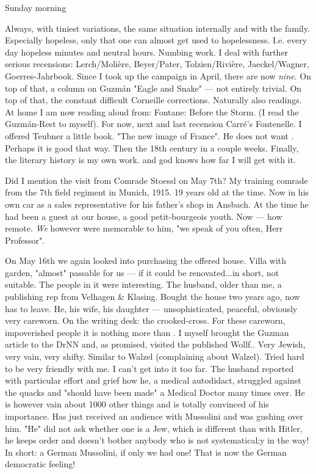 Sunday morning

Always, with tiniest variations, the same situation internally and with the family. Especially hopeless, only that one can almost get used to hopelessness. I.e. every day hopeless minutes and neutral hours.  
Numbing work. I deal with further serious recensions: Lerch/Molière, Beyer/Pater, Tolzien/Rivière, Jaeckel/Wagner, Goerres-Jahrbook. Since I took up the campaign in April, there are now \textit{nine}. On top of that, a column on Guzmán "Eagle and Snake" — not entirely trivial. On top of that, the constant difficult Corneille corrections. Naturally also readings. 
At home I am now reading aloud from: Fontane: Before the Storm. (I read the Guzmán-Rest to myself). For now, next and last recension Carré's Fontenelle.
I offered Teubner a little book. "The new image of France". He does not want . Perhaps it is good that way. Then  the 18th century in a couple weeks. Finally, the literary history is my own work. and god knows how far I will get with it.

Did I mention the visit from Comrade Stoessl on May 7th? My training comrade from the 7th field regiment in Munich, 1915. 19 years old at the time. Now in his own car as a sales representative for his father's shop in Ansbach. At the time he had been a guest at our house, a good petit-bourgeois youth. Now — how remote. \textit{We} however were memorable to him, "we speak of you often, Herr Professor".

On May 16th we again looked into purchasing the offered house. Villa with garden, "almost" passable for us — if it could be renovated...in short, not suitable. The people in it were interesting. The husband, older than me, a publishing rep from Velhagen & Klasing. Bought the house two years ago, now has to leave. He, his wife, his daughter — unsophisticated, peaceful, obviously very careworn. On the writing desk: the crooked-cross. For these careworn, impoverished people it is nothing more than .
I myself brought the Guzman article to the DrNN and, as promised, visited the published Wollf.. Very Jewish, very vain, very shifty. Similar to Walzel (complaining about Walzel). Tried hard to be very friendly with me. I can't get into it too far. The husband reported with particular effort and grief how he, a medical autodidact, struggled against the quacks and "should have been made" a Medical Doctor many times over. He is however vain about 1000 other things and is totally convinced of his importance. Has just received an audience with Mussolini and was gushing over him. "He" did not ask whether one is a Jew, which is different than with Hitler, he keeps order and doesn't bother anybody who is not systematical;y in the way! In short: a German Mussolini, if only we had one! That is now the German democratic feeling!